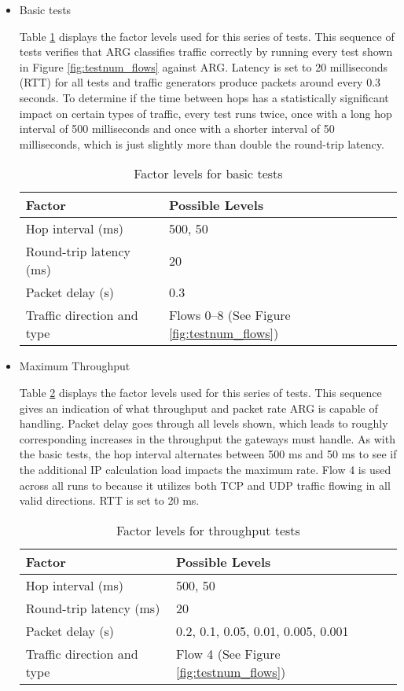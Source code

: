 \begin{itemize}
	\item Basic tests
	\par Table \ref{tbl:basic_factors} displays the factor levels used for this series of tests. This sequence of tests verifies that \ac{ARG} classifies traffic correctly by running every test shown in Figure \ref{fig:testnum_flows} against \ac{ARG}. Latency is set to 20 milliseconds (\ac{RTT}) for all tests and traffic generators produce packets around every 0.3 seconds. To determine if the time between hops has a statistically significant impact on certain types of traffic, every test runs twice, once with a long hop interval of 500 milliseconds and once with a shorter interval of 50 milliseconds, which is just slightly more than double the round-trip latency.

\begin{table}
\caption{Factor levels for basic tests}
\label{tbl:basic_factors}
\centering
\begin{tabular}{l|l}
\textbf{Factor} & \textbf{Possible Levels} \\
\hline
Hop interval (ms) & 500, 50\\
Round-trip latency (ms) & 20\\
Packet delay (s) & 0.3\\
Traffic direction and type & Flows 0--8 (See Figure \ref{fig:testnum_flows})
\end{tabular}
\end{table}

	\item Maximum Throughput
	\par Table \ref{tbl:throughput_factors} displays the factor levels used for this series of tests. This sequence gives an indication of what throughput and packet rate \ac{ARG} is capable of handling. Packet delay goes through all levels shown, which leads to roughly corresponding increases in the throughput the gateways must handle. As with the basic tests, the hop interval alternates between 500 ms and 50 ms to see if the additional \ac{IP} calculation load impacts the maximum rate. Flow 4 is used across all runs to because it utilizes both \ac{TCP} and \ac{UDP} traffic flowing in all valid directions. \ac{RTT} is set to 20 ms.

\begin{table}
\caption{Factor levels for throughput tests}
\label{tbl:throughput_factors}
\centering
\begin{tabular}{l|l}
\textbf{Factor} & \textbf{Possible Levels} \\
\hline
Hop interval (ms) & 500, 50\\
Round-trip latency (ms) & 20\\
Packet delay (s) & 0.2, 0.1, 0.05, 0.01, 0.005, 0.001\\
Traffic direction and type & Flow 4 (See Figure \ref{fig:testnum_flows})
\end{tabular}
\end{table}


\end{itemize}
